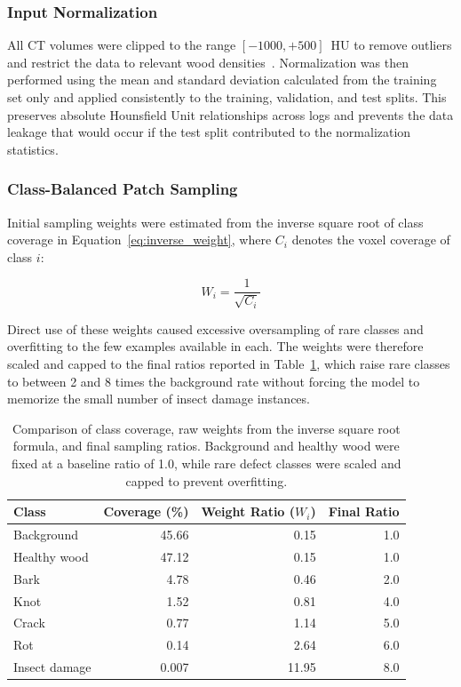 \subsubsection*{Input Normalization}

All CT volumes were clipped to the range $[-1000, +500]$~HU to remove outliers and restrict the data to relevant wood densities~\cite{freyburger2009measuring}. Normalization was then performed using the mean and standard deviation calculated from the training set only and applied consistently to the training, validation, and test splits. This preserves absolute Hounsfield Unit relationships across logs and prevents the data leakage that would occur if the test split contributed to the normalization statistics.

\subsubsection*{Class-Balanced Patch Sampling}

Initial sampling weights were estimated from the inverse square root of class coverage in Equation~\ref{eq:inverse_weight}, where $C_i$ denotes the voxel coverage of class $i$:

\begin{equation}
    W_i = \frac{1}{\sqrt{C_i}}
    \label{eq:inverse_weight}
\end{equation}

Direct use of these weights caused excessive oversampling of rare classes and overfitting to the few examples available in each. The weights were therefore scaled and capped to the final ratios reported in Table~\ref{tab:sampling_ratios}, which raise rare classes to between 2 and 8 times the background rate without forcing the model to memorize the small number of insect damage instances.

\begin{table}[htbp]
\centering
\caption{Comparison of class coverage, raw weights from the inverse square root formula, and final sampling ratios. Background and healthy wood were fixed at a baseline ratio of 1.0, while rare defect classes were scaled and capped to prevent overfitting.}
\label{tab:sampling_ratios}
\begin{tabular}{lrrr}
    \toprule
    \textbf{Class} & \textbf{Coverage (\%)} & \textbf{Weight Ratio ($W_i$)} & \textbf{Final Ratio} \\
    \midrule
    Background     & 45.66 & 0.15  & 1.0 \\
    Healthy wood   & 47.12 & 0.15  & 1.0 \\
    Bark           &  4.78 & 0.46  & 2.0 \\
    Knot           &  1.52 & 0.81  & 4.0 \\
    Crack          &  0.77 & 1.14  & 5.0 \\
    Rot            &  0.14 & 2.64  & 6.0 \\
    Insect damage  &  0.007 & 11.95 & 8.0 \\
    \bottomrule
\end{tabular}
\end{table}

